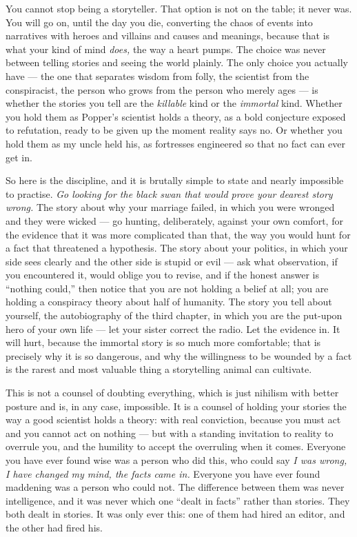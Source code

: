 You cannot stop being a storyteller. That option is not on the table; it never was. You will go on, until the day you die, converting the chaos of events into narratives with heroes and villains and causes and meanings, because that is what your kind of mind \emph{does,} the way a heart pumps. The choice was never between telling stories and seeing the world plainly. The only choice you actually have — the one that separates wisdom from folly, the scientist from the conspiracist, the person who grows from the person who merely ages — is whether the stories you tell are the \emph{killable} kind or the \emph{immortal} kind. Whether you hold them as Popper's scientist holds a theory, as a bold conjecture exposed to refutation, ready to be given up the moment reality says no. Or whether you hold them as my uncle held his, as fortresses engineered so that no fact can ever get in.

So here is the discipline, and it is brutally simple to state and nearly impossible to practise. \emph{Go looking for the black swan that would prove your dearest story wrong.} The story about why your marriage failed, in which you were wronged and they were wicked — go hunting, deliberately, against your own comfort, for the evidence that it was more complicated than that, the way you would hunt for a fact that threatened a hypothesis. The story about your politics, in which your side sees clearly and the other side is stupid or evil — ask what observation, if you encountered it, would oblige you to revise, and if the honest answer is ``nothing could,'' then notice that you are not holding a belief at all; you are holding a conspiracy theory about half of humanity. The story you tell about yourself, the autobiography of the third chapter, in which you are the put-upon hero of your own life — let your sister correct the radio. Let the evidence in. It will hurt, because the immortal story is so much more comfortable; that is precisely why it is so dangerous, and why the willingness to be wounded by a fact is the rarest and most valuable thing a storytelling animal can cultivate.

This is not a counsel of doubting everything, which is just nihilism with better posture and is, in any case, impossible. It is a counsel of holding your stories the way a good scientist holds a theory: with real conviction, because you must act and you cannot act on nothing — but with a standing invitation to reality to overrule you, and the humility to accept the overruling when it comes. Everyone you have ever found wise was a person who did this, who could say \emph{I was wrong, I have changed my mind, the facts came in.} Everyone you have ever found maddening was a person who could not. The difference between them was never intelligence, and it was never which one ``dealt in facts'' rather than stories. They both dealt in stories. It was only ever this: one of them had hired an editor, and the other had fired his.

